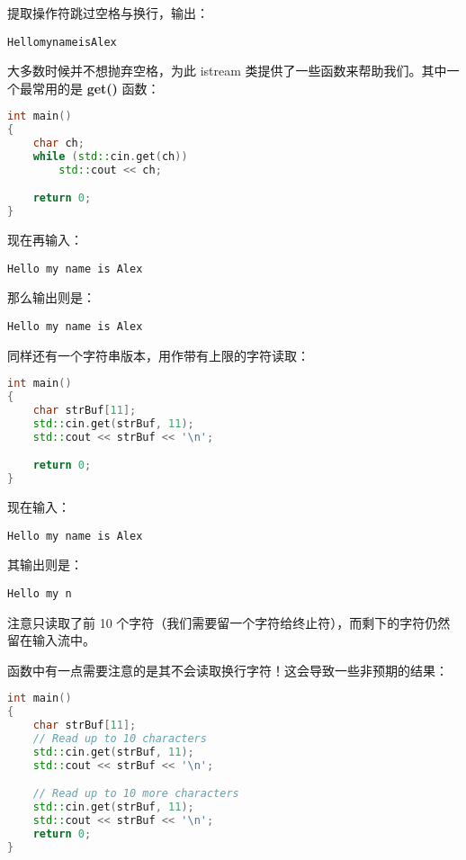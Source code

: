 \documentclass[../../LearnCpp.tex]{subfiles}
\begin{document}
提取操作符跳过空格与换行，输出：

\begin{lstlisting}
HellomynameisAlex
\end{lstlisting}

大多数时候并不想抛弃空格，为此 istream 类提供了一些函数来帮助我们。其中一个最常用的是 \textbf{get()} 函数：

\begin{lstlisting}[language=C++]
int main()
{
    char ch;
    while (std::cin.get(ch))
        std::cout << ch;

    return 0;
}
\end{lstlisting}

现在再输入：

\begin{lstlisting}
Hello my name is Alex
\end{lstlisting}

那么输出则是：

\begin{lstlisting}
Hello my name is Alex
\end{lstlisting}

 同样还有一个字符串版本，用作带有上限的字符读取：


\begin{lstlisting}[language=C++]
int main()
{
    char strBuf[11];
    std::cin.get(strBuf, 11);
    std::cout << strBuf << '\n';

    return 0;
}
\end{lstlisting}

现在输入：

\begin{lstlisting}
Hello my name is Alex
\end{lstlisting}

其输出则是：

\begin{lstlisting}
Hello my n
\end{lstlisting}

注意只读取了前 10 个字符（我们需要留一个字符给终止符），而剩下的字符仍然留在输入流中。

 函数中有一点需要注意的是其不会读取换行字符！这会导致一些非预期的结果：

\begin{lstlisting}[language=C++]
int main()
{
    char strBuf[11];
    // Read up to 10 characters
    std::cin.get(strBuf, 11);
    std::cout << strBuf << '\n';

    // Read up to 10 more characters
    std::cin.get(strBuf, 11);
    std::cout << strBuf << '\n';
    return 0;
}
\end{lstlisting}
\end{document}
